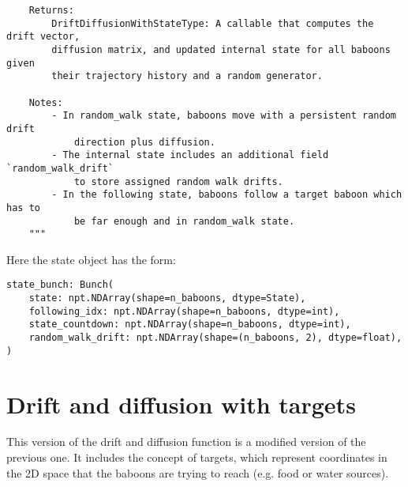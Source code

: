 \documentclass[
    article,
    oneside,
]{memoir}
\begin{document}
\begin{verbatim}
    Returns:
        DriftDiffusionWithStateType: A callable that computes the drift vector,
        diffusion matrix, and updated internal state for all baboons given
        their trajectory history and a random generator.

    Notes:
        - In random_walk state, baboons move with a persistent random drift
            direction plus diffusion.
        - The internal state includes an additional field `random_walk_drift`
            to store assigned random walk drifts.
        - In the following state, baboons follow a target baboon which has to
            be far enough and in random_walk state.
    """
\end{verbatim}

Here the state object has the form:
\begin{verbatim}
state_bunch: Bunch(
    state: npt.NDArray(shape=n_baboons, dtype=State),
    following_idx: npt.NDArray(shape=n_baboons, dtype=int),
    state_countdown: npt.NDArray(shape=n_baboons, dtype=int),
    random_walk_drift: npt.NDArray(shape=(n_baboons, 2), dtype=float),
)
\end{verbatim}

\section{Drift and diffusion with targets}

This version of the drift and diffusion function is a modified version of the previous one. It includes the concept of targets, which represent coordinates in the 2D space that the baboons are trying to reach (e.g. food or water sources).
\end{document}
